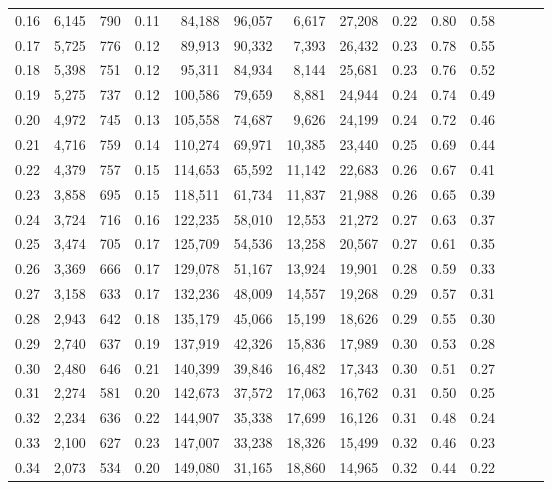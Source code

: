 \begin{tabular}{rrrrrrrrrrrrrr}
0.16 &  6,145 &  790 &  0.11 &   84,188 &   96,057 &   6,617 &  27,208 &  0.22 &  0.80 &      0.58 \\
0.17 &  5,725 &  776 &  0.12 &   89,913 &   90,332 &   7,393 &  26,432 &  0.23 &  0.78 &      0.55 \\
0.18 &  5,398 &  751 &  0.12 &   95,311 &   84,934 &   8,144 &  25,681 &  0.23 &  0.76 &      0.52 \\
0.19 &  5,275 &  737 &  0.12 &  100,586 &   79,659 &   8,881 &  24,944 &  0.24 &  0.74 &      0.49 \\
0.20 &  4,972 &  745 &  0.13 &  105,558 &   74,687 &   9,626 &  24,199 &  0.24 &  0.72 &      0.46 \\
0.21 &  4,716 &  759 &  0.14 &  110,274 &   69,971 &  10,385 &  23,440 &  0.25 &  0.69 &      0.44 \\
0.22 &  4,379 &  757 &  0.15 &  114,653 &   65,592 &  11,142 &  22,683 &  0.26 &  0.67 &      0.41 \\
0.23 &  3,858 &  695 &  0.15 &  118,511 &   61,734 &  11,837 &  21,988 &  0.26 &  0.65 &      0.39 \\
0.24 &  3,724 &  716 &  0.16 &  122,235 &   58,010 &  12,553 &  21,272 &  0.27 &  0.63 &      0.37 \\
0.25 &  3,474 &  705 &  0.17 &  125,709 &   54,536 &  13,258 &  20,567 &  0.27 &  0.61 &      0.35 \\
0.26 &  3,369 &  666 &  0.17 &  129,078 &   51,167 &  13,924 &  19,901 &  0.28 &  0.59 &      0.33 \\
0.27 &  3,158 &  633 &  0.17 &  132,236 &   48,009 &  14,557 &  19,268 &  0.29 &  0.57 &      0.31 \\
0.28 &  2,943 &  642 &  0.18 &  135,179 &   45,066 &  15,199 &  18,626 &  0.29 &  0.55 &      0.30 \\
0.29 &  2,740 &  637 &  0.19 &  137,919 &   42,326 &  15,836 &  17,989 &  0.30 &  0.53 &      0.28 \\
0.30 &  2,480 &  646 &  0.21 &  140,399 &   39,846 &  16,482 &  17,343 &  0.30 &  0.51 &      0.27 \\
0.31 &  2,274 &  581 &  0.20 &  142,673 &   37,572 &  17,063 &  16,762 &  0.31 &  0.50 &      0.25 \\
0.32 &  2,234 &  636 &  0.22 &  144,907 &   35,338 &  17,699 &  16,126 &  0.31 &  0.48 &      0.24 \\
0.33 &  2,100 &  627 &  0.23 &  147,007 &   33,238 &  18,326 &  15,499 &  0.32 &  0.46 &      0.23 \\
0.34 &  2,073 &  534 &  0.20 &  149,080 &   31,165 &  18,860 &  14,965 &  0.32 &  0.44 &      0.22 \\

\end{tabular}

